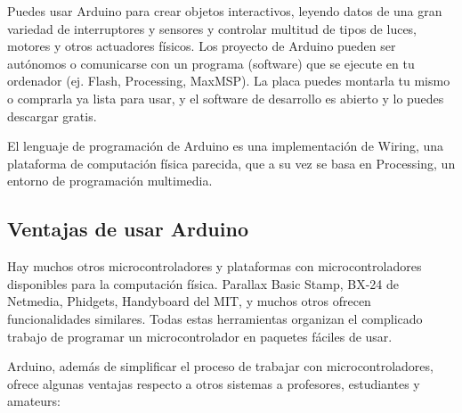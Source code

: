 \documentclass[12pt,a4papert,woside,openright,titlepage,final]{book}
\begin{document}
Puedes usar Arduino para crear objetos interactivos, leyendo datos de una gran
variedad de interruptores y sensores y controlar multitud de tipos de luces,
motores y otros actuadores físicos. Los proyecto de Arduino pueden ser autónomos
o comunicarse con un programa (software) que se ejecute en tu ordenador (ej.
Flash, Processing, MaxMSP). La placa puedes montarla tu mismo o comprarla ya
lista para usar, y el software de desarrollo es abierto y lo puedes descargar
gratis.

El lenguaje de programación de Arduino es una implementación de Wiring, una
plataforma de computación física parecida, que a su vez se basa en Processing,
un entorno de programación multimedia.


\subsection{Ventajas de usar Arduino}

Hay muchos otros microcontroladores y plataformas con microcontroladores
disponibles para la computación física. Parallax Basic Stamp, BX-24 de Netmedia,
Phidgets, Handyboard del MIT, y muchos otros ofrecen funcionalidades similares.
Todas estas herramientas organizan el complicado trabajo de programar un
microcontrolador en paquetes fáciles de usar.

Arduino, además de simplificar el proceso de trabajar con microcontroladores,
ofrece algunas ventajas respecto a otros sistemas a profesores, estudiantes y
amateurs:
\end{document}
